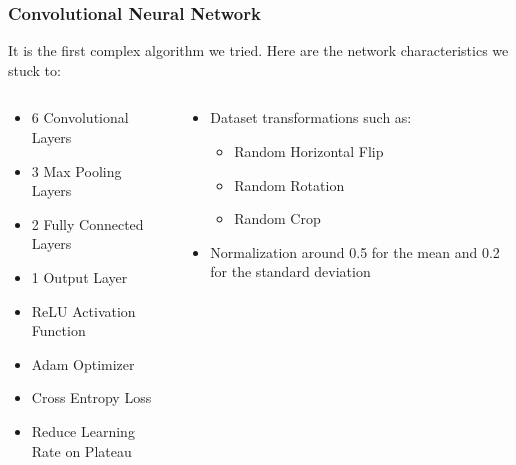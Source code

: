 \documentclass{beamer}
\begin{document}
\begin{frame}
\frametitle{Convolutional Neural Network}
It is the first complex algorithm we tried. Here are the network characteristics we stuck to:
\begin{columns}
    \begin{column}{0.5\textwidth}
        \begin{itemize}
            \item 6 Convolutional Layers
            \item 3 Max Pooling Layers
            \item 2 Fully Connected Layers
            \item 1 Output Layer
            \item ReLU Activation Function
            \item Adam Optimizer
            \item Cross Entropy Loss
            \item Reduce Learning Rate on Plateau
        \end{itemize}
    \end{column}
    \begin{column}{0.5\textwidth}
        \begin{itemize}
            \item Dataset transformations such as:
            \begin{itemize}
                \item Random Horizontal Flip
                \item Random Rotation
                \item Random Crop    
            \end{itemize}
            \item Normalization around 0.5 for the mean and 0.2 for the standard deviation
        \end{itemize}
    \end{column}
\end{columns}
\end{frame}
\end{document}

